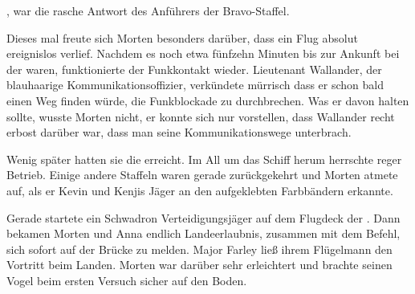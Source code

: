 \par

, war die rasche Antwort des Anführers der Bravo-Staffel. 

\par

Dieses mal freute sich Morten besonders darüber, dass ein Flug absolut ereignislos verlief. Nachdem es noch etwa fünfzehn Minuten bis zur Ankunft bei der  waren, funktionierte der Funkkontakt wieder. Lieutenant Wallander, der blauhaarige Kommunikationsoffizier, verkündete mürrisch dass er schon bald einen Weg finden würde, die Funkblockade zu durchbrechen. Was er davon halten sollte, wusste Morten nicht, er konnte sich nur vorstellen, dass Wallander recht erbost darüber war, dass man seine Kommunikationswege unterbrach.

\par

Wenig später hatten sie die  erreicht. Im All um das Schiff herum herrschte reger Betrieb. Einige andere Staffeln waren gerade zurückgekehrt und Morten atmete auf, als er Kevin und Kenjis Jäger an den aufgeklebten Farbbändern erkannte.

\par

Gerade startete ein Schwadron Verteidigungsjäger auf dem Flugdeck der . Dann bekamen Morten und Anna endlich Landeerlaubnis, zusammen mit dem Befehl, sich sofort auf der Brücke zu melden. Major Farley ließ ihrem Flügelmann den Vortritt beim Landen. Morten war darüber sehr erleichtert und brachte seinen Vogel beim ersten Versuch sicher auf den Boden.

